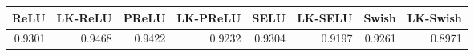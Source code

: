 \begin{tabular}{rrrrrrrr}
\toprule
ReLU &  LK-ReLU &   PReLU &  LK-PReLU &    SELU &  LK-SELU &   Swish &  LK-Swish \\
\midrule
0.9301 &   0.9468 &  0.9422 &    0.9232 &  0.9304 &   0.9197 &  0.9261 &    0.8971 \\
\bottomrule
\end{tabular}
